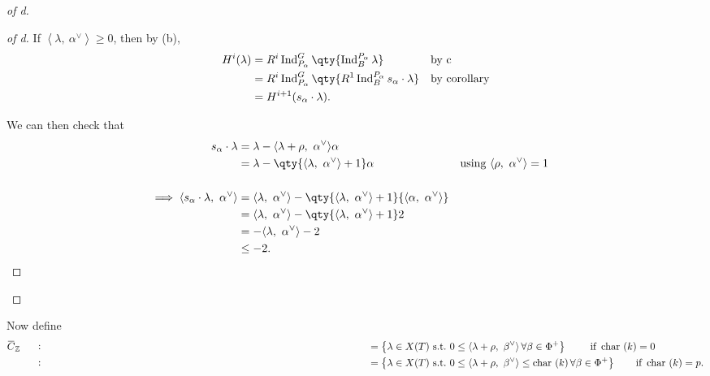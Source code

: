 \begin{proof}[of d]

\begin{proof}[of d]

If \({\left\langle {\lambda},~{\alpha^\vee} \right\rangle} \geq 0\),
then by (b),
\begin{align*}   H^i(\lambda)  &= R^i \operatorname{Ind}_{P_\alpha}^G \qty{ \operatorname{Ind}_B^{P_\alpha} \lambda } && \text{by c}\\ &= R^i \operatorname{Ind}_{P_\alpha}^G \qty{ R^1 \operatorname{Ind}_B^{P_\alpha} s_\alpha\cdot \lambda } && \text{by corollary}\\ &= H^{i+1}(s_\alpha\cdot \lambda) .\end{align*}

We can then check that
\begin{align*}   s_\alpha \cdot \lambda &= \lambda - {\left\langle {\lambda + \rho},~{\alpha^\vee} \right\rangle}\alpha \\ &= \lambda - \qty{ {\left\langle {\lambda},~{\alpha^\vee} \right\rangle} + 1 }\alpha && \text{using } {\left\langle {\rho},~{\alpha^\vee} \right\rangle} = 1 \\ \\ \implies  {\left\langle {s_\alpha \cdot \lambda},~{\alpha^\vee} \right\rangle} &= {\left\langle {\lambda},~{\alpha^\vee} \right\rangle} - \qty{ {\left\langle {\lambda},~{\alpha^\vee} \right\rangle}+1 }{\left\langle {\alpha},~{\alpha^\vee} \right\rangle} \\ &= {\left\langle {\lambda},~{\alpha^\vee} \right\rangle} - \qty{ {\left\langle {\lambda},~{\alpha^\vee} \right\rangle}+1 }2 \\ &= -{\left\langle {\lambda},~{\alpha^\vee} \right\rangle} - 2 \\ &\leq -2 .\end{align*}

\end{proof}

\end{proof}

Now define
\begin{align*}   \mkern 1.5mu\overline{\mkern-1.5muC\mkern-1.5mu}\mkern 1.5mu_{{\mathbb{Z}}}  &\mathrel{\vcenter{:}}= \left\{{ \lambda \in X(T) ~{\text{s.t.}}~0 \leq {\left\langle {\lambda+\rho},~{\beta^\vee} \right\rangle} \,\forall \beta \in \Phi^+ }\right\} \qquad\text{ if } \operatorname{char}~(k) = 0 \\ &\mathrel{\vcenter{:}}= \left\{{ \lambda \in X(T) ~{\text{s.t.}}~0 \leq {\left\langle {\lambda+\rho},~{\beta^\vee} \right\rangle} \leq \operatorname{char}~(k) \,\forall \beta \in \Phi^+ }\right\} \qquad\text{if } \operatorname{char}~(k) = p .\end{align*}

